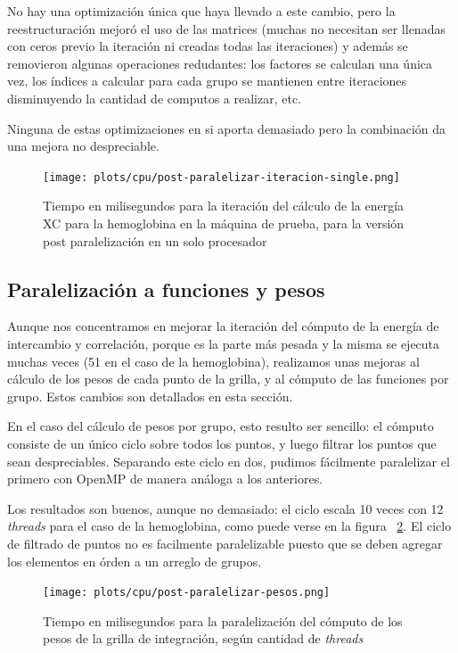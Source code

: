 No hay una optimizaci\'on única que haya llevado a este cambio, pero la
reestructuraci\'on mejor\'o el uso de las matrices (muchas no necesitan ser
llenadas con ceros previo la iteraci\'on ni creadas todas las iteraciones) y
adem\'as se removieron algunas operaciones redudantes: los factores se calculan
una \'unica vez, los \'indices a calcular para cada grupo se mantienen entre
iteraciones disminuyendo la cantidad de computos a realizar, etc.

Ninguna de estas optimizaciones en si aporta demasiado pero la combinaci\'on
da una mejora no despreciable.

\begin{figure}[htbp]
   \centering
   \texttt{[image: plots/cpu/post-paralelizar-iteracion-single.png]}
   \caption{Tiempo en milisegundos para la iteración del cálculo de la energía
   XC para la hemoglobina en la máquina de prueba, para la versi\'on
   post paralelizaci\'on en un solo procesador}
   \label{fig:post-paralelizacion-single}
\end{figure}

\subsection{Paralelizaci\'on a funciones y pesos}

Aunque nos concentramos en mejorar la iteraci\'on del c\'omputo de la energ\'ia
de intercambio y correlaci\'on, porque es la parte m\'as pesada y la misma se
ejecuta muchas veces (51 en el caso de la hemoglobina), realizamos unas mejoras
al c\'alculo de los pesos de cada punto de la grilla, y al c\'omputo de
las funciones por grupo. Estos cambios son detallados en esta secci\'on.

En el caso del c\'alculo de pesos por grupo, esto resulto ser sencillo: el
c\'omputo consiste de un \'unico ciclo sobre todos los puntos, y luego filtrar los
puntos que sean despreciables. Separando este ciclo en dos, pudimos f\'acilmente
paralelizar el primero con OpenMP de manera an\'aloga a los anteriores.

Los resultados son buenos, aunque no demasiado: el ciclo escala 10 veces con 12
\textit{threads} para el caso de la hemoglobina, como puede verse en la figura
~\ref{fig:weights-paralelizado}. El ciclo de filtrado de puntos no es facilmente
paralelizable puesto que se deben agregar los elementos en \'orden a un arreglo
de grupos.

\begin{figure}[htbp]
   \centering
   \texttt{[image: plots/cpu/post-paralelizar-pesos.png]}
   \caption{Tiempo en milisegundos para la paralelizaci\'on del c\'omputo de los pesos
    de la grilla de integraci\'on, seg\'un cantidad de \textit{threads}}
   \label{fig:weights-paralelizado}
\end{figure}

